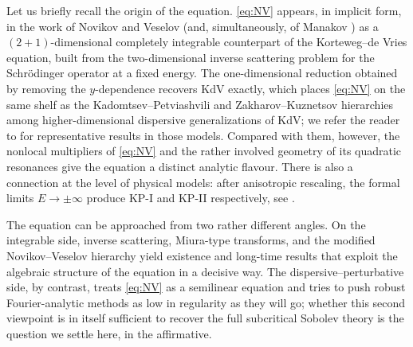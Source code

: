 \documentclass[a4paper,
11pt,  reqno]{amsart}
\newcommand{\5}{\textup{V}}
\theoremstyle{remark}
\numberwithin{equation}{section}
\numberwithin{theorem}{section}
\begin{document}
Let us briefly recall the origin of the equation. \eqref{eq:NV} appears, in implicit form, in the work of Novikov and Veselov \cite{NovikovVeselov} (and, simultaneously, of Manakov \cite{Manakov}) as a $(2+1)$-dimensional completely integrable counterpart of the Korteweg--de Vries equation, built from the two-dimensional inverse scattering problem for the Schr\"odinger operator at a fixed energy. The one-dimensional reduction obtained by removing the $y$-dependence recovers KdV exactly, which places \eqref{eq:NV} on the same shelf as the Kadomtsev--Petviashvili and Zakharov--Kuznetsov hierarchies among higher-dimensional dispersive generalizations of KdV; we refer the reader to \cite{bourg_kpii, takaokaTzvetkov, HHK, IonescuKenigTataru, GuoPengWang, Kinoshita_ZK} for representative results in those models. Compared with them, however, the nonlocal multipliers of \eqref{eq:NV} and the rather involved geometry of its quadratic resonances give the equation a distinct analytic flavour. There is also a connection at the level of physical models: after anisotropic rescaling, the formal limits $E\to\pm\infty$ produce KP-I and KP-II respectively, see \cite{kazeykinamunoz1, kazeykinamunoz2}.

\medskip

The equation can be approached from two rather different angles. On the integrable side, inverse scattering, Miura-type transforms, and the modified Novikov--Veselov hierarchy yield existence and long-time results that exploit the algebraic structure of the equation in a decisive way. The dispersive--perturbative side, by contrast, treats \eqref{eq:NV} as a semilinear equation and tries to push robust Fourier-analytic methods as low in regularity as they will go; whether this second viewpoint is in itself sufficient to recover the full subcritical Sobolev theory is the question we settle here, in the affirmative.

\medskip
\end{document}
